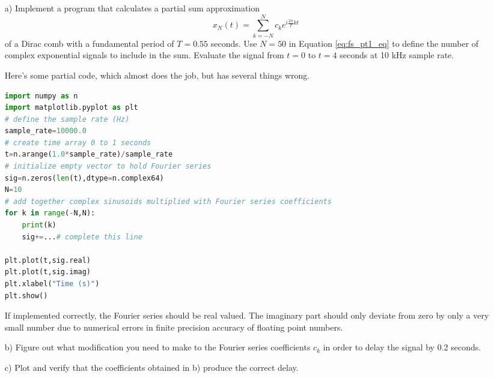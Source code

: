 \begin{itemize}
\item[a)] Implement a program that calculates a partial sum
  approximation
  \begin{equation}
    x_N(t) = \sum_{k=-N}^{N} c_k e^{i \frac{2\pi}{T}kt}
    \label{eq:fs_pt1_eq}
\end{equation}
  of a Dirac comb with a fundamental period of $T=0.55$ seconds. Use
  $N=50$ in Equation \ref{eq:fs_pt1_eq} to define the number of
  complex exponential signals to include in the sum. Evaluate the
  signal from $t=0$ to $t=4$ seconds at 10 kHz sample rate.

  Here's some partial code, which almost does the
  job, but has several things wrong.
\begin{lstlisting}[language=Python,numbers=none]
import numpy as n
import matplotlib.pyplot as plt
# define the sample rate (Hz)
sample_rate=10000.0
# create time array 0 to 1 seconds
t=n.arange(1.0*sample_rate)/sample_rate
# initialize empty vector to hold Fourier series
sig=n.zeros(len(t),dtype=n.complex64)
N=10
# add together complex sinusoids multiplied with Fourier series coefficients
for k in range(-N,N):
    print(k)
    sig+=...# complete this line
    
plt.plot(t,sig.real)
plt.plot(t,sig.imag)
plt.xlabel("Time (s)")
plt.show()
\end{lstlisting}
If implemented correctly, the Fourier series should be real
  valued. The imaginary part should only deviate from zero by only a
  very small number due to numerical errors in finite precision
  accuracy of floating point numbers.
  
\item[b)] Figure out what modification you need to make to the Fourier series coefficients $c_k$ in order to delay the signal by 0.2 seconds.

\item[c)] Plot and verify that the coefficients obtained in b) produce the correct delay.


\end{itemize}
